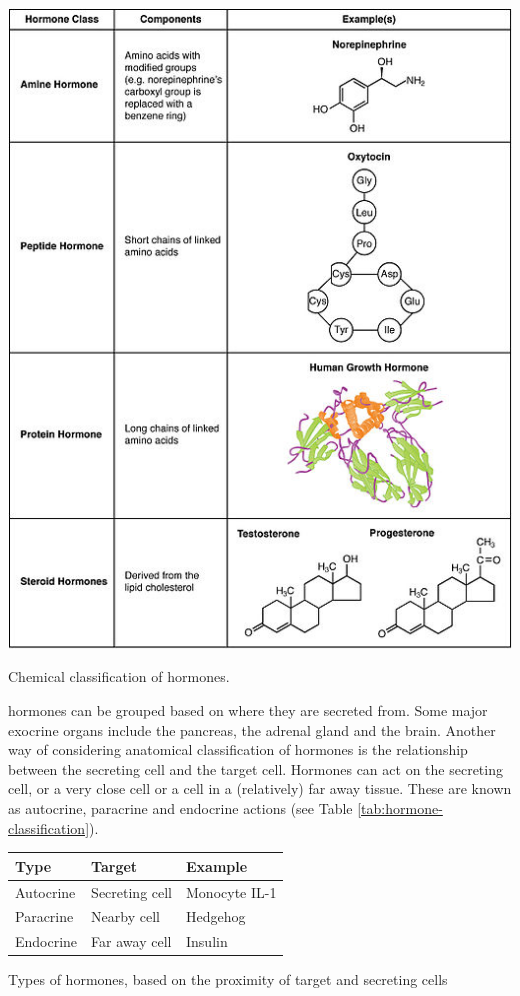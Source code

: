 \documentclass{tufte-handout}
\begin{document}
\begin{marginfigure}[-4in]
  \includegraphics{figures/hormone-classification}
  \caption{Chemical classification of hormones.}
    \label{fig:chemical-classification}
\end{marginfigure}

 hormones can be grouped based on where they are secreted from.  Some major exocrine organs include the pancreas, the adrenal gland and the brain.  Another way of considering anatomical classification of hormones is the relationship between the secreting cell and the target cell.  Hormones can act on the secreting cell, or a very close cell or a cell in a (relatively) far away tissue.  These are known as autocrine, paracrine and endocrine actions (see Table \ref{tab:hormone-classification}).

\begin{margintable}
  \centering
  \begin{tabular}{lll}
    \toprule
    Type & Target & Example \\
    \midrule
    Autocrine & Secreting cell & Monocyte IL-1\\
    Paracrine & Nearby cell & Hedgehog \\
    Endocrine & Far away cell & Insulin \\
    \bottomrule
  \end{tabular}
  \caption{Types of hormones, based on the proximity of target and secreting cells}
  \label{tab:hormone-classification}
\end{margintable}
\end{document}
